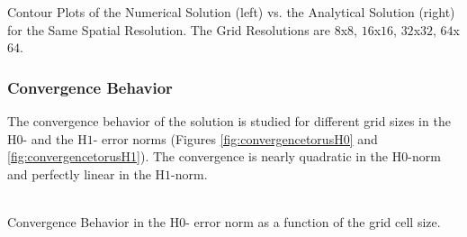 \documentclass[a4paper,12pt]{article}
\makeatletter
\newenvironment{figurehere}
  {\def\@captype{figure}}
  {}
\makeatother
\begin{document}
\begin{center}
\begin{figurehere}
\caption{Contour Plots of the Numerical Solution (left) vs. the Analytical Solution (right) for the Same Spatial Resolution. The Grid Resolutions are $8$x$8$, $16$x$16$, $32$x$32$, $64$x$64$.}\label{fig:correctcontourplots}
\end{figurehere}
\end{center}
\subsubsection{Convergence Behavior}
The convergence behavior of the solution is studied for different grid sizes in the H$0$- and the H$1$- error norms (Figures \ref{fig:convergencetorusH0} and \ref{fig:convergencetorusH1}). The convergence is nearly quadratic in the H$0$-norm and perfectly linear in the H$1$-norm.
\begin{center}
\begin{figurehere}
\\
\caption{Convergence Behavior in the H$0$- error norm as a function of the grid cell size.}\label{fig:convergencetorusH0}
\end{figurehere}
\end{center}
\end{document}
